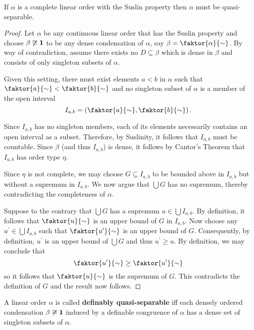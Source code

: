 \begin{prp}
	If $\alpha$ is a complete linear order with the Suslin property then
	$\alpha$ must be quasi-separable.
\end{prp}
\begin{proof}
	Let $\alpha$ be any continuous linear order that has the Suslin property and
	choose $\beta\not\cong\mathbf{1}$ to be any dense condensation of $\alpha$, say
	$\beta=\faktor{\alpha}{\sim}$.  By way of contradiction, assume there exists no
	$D\subseteq\beta$ which is dense in $\beta$ and consists of only singleton
	subsets of $\alpha$.

	Given this setting, there must exist elements $a<b$ in $\alpha$ such that
	$\faktor{a}{\sim}<\faktor{b}{\sim}$ and no singleton subset of $\alpha$ is a
	member of the open interval
	\begin{equation}
		I_{a,b}=\left(\faktor{a}{\sim},\faktor{b}{\sim}\right).
	\end{equation}

	Since $I_{a,b}$ has no singleton members, each of its elements necessarily
	contains an open interval as a subset.  Therefore, by Suslinity, it follows
	that $I_{a,b}$ must be countable.  Since $\beta$ (and thus $I_{a,b}$) is dense,
	it follows by Cantor's Theorem that $I_{a,b}$ has order type $\eta$.

	Since $\eta$ is not complete, we may choose $G\subseteq I_{a,b}$ to be
	bounded above in $I_{{a,b}}$ but without a supremum in $I_{a,b}$.  We
	now argue that $\bigcup G$ has no supremum, thereby contradicting the
	completeness of $\alpha$.

	Suppose to the contrary that $\bigcup G$ has a supremum
	$u\in \bigcup I_{a,b}$.  By definition, it follows that $\faktor{u}{\sim}$ is an
	upper bound of $G$ in $I_{a,b}$.  Now choose any $u^{\prime}\in\bigcup I_{a,b}$
	such that $\faktor{u^{\prime}}{\sim}$ is an upper bound of $G$.  Consequently,
	by definition, $u^{\prime}$ is an upper bound of $\bigcup G$ and thus
	$u^{\prime}\geq u$.  By definition, we may conclude that
	\begin{equation}
		\faktor{u^{\prime}}{\sim}\geq\faktor{u^{\prime}}{\sim}
	\end{equation}
	so it follows that $\faktor{u}{\sim}$ is the supremum of $G$.  This
	contradicts the definition of $G$ and the result now follows.
\end{proof}

\begin{dfn}
	A linear order $\alpha$ is called \textbf{definably quasi-separable} iff
	each densely ordered condensation $\beta\not\cong\mathbf{1}$ induced by a definable
	congruence of $\alpha$ has a dense set of singleton subsets of $\alpha$.
\end{dfn}

